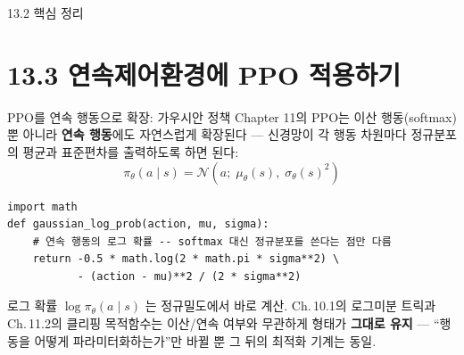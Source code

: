 \documentclass[aspectratio=169,11pt]{beamer}
\begin{document}
\begin{frame}{13.2 핵심 정리}
\end{frame}

\section{13.3 연속제어환경에 PPO 적용하기}

\begin{frame}[fragile]{PPO를 연속 행동으로 확장: 가우시안 정책}
  Chapter 11의 PPO는 이산 행동(softmax)뿐 아니라 \textbf{연속 행동}에도
  자연스럽게 확장된다 --- 신경망이 각 행동 차원마다 정규분포의 평균과
  표준편차를 출력하도록 하면 된다:
  \[
    \pi_\theta(a \mid s) = \mathcal{N}(a;\; \mu_\theta(s),\; \sigma_\theta(s)^2)
  \]
\begin{lstlisting}
import math
def gaussian_log_prob(action, mu, sigma):
    # 연속 행동의 로그 확률 -- softmax 대신 정규분포를 쓴다는 점만 다름
    return -0.5 * math.log(2 * math.pi * sigma**2) \
           - (action - mu)**2 / (2 * sigma**2)
\end{lstlisting}
  {\footnotesize 로그 확률 $\log \pi_\theta(a \mid s)$ 는 정규밀도에서 바로
  계산. Ch.\,10.1의 로그미분 트릭과 Ch.\,11.2의 클리핑 목적함수는 이산/연속
  여부와 무관하게 형태가 \textbf{그대로 유지} --- ``행동을 어떻게
  파라미터화하는가''만 바뀔 뿐 그 뒤의 최적화 기계는 동일.}
\end{frame}
\end{document}
